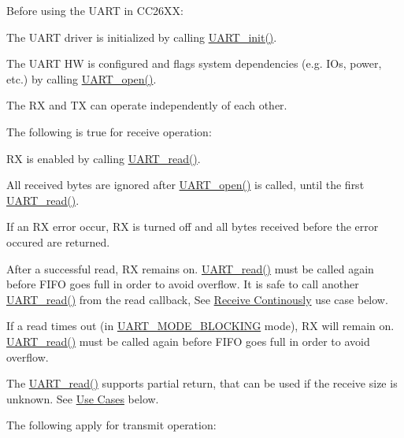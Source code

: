 Before using the U\+A\+R\+T in C\+C26\+X\+X\+:
\begin{DoxyItemize}
\item The U\+A\+R\+T driver is initialized by calling \hyperlink{_u_a_r_t_8h_ab60a36f7295d704926120d22f806dcd1}{U\+A\+R\+T\+\_\+init()}.
\item The U\+A\+R\+T H\+W is configured and flags system dependencies (e.\+g. I\+Os, power, etc.) by calling \hyperlink{_u_a_r_t_8h_a0442ea1ec23901168da31726bb3254c1}{U\+A\+R\+T\+\_\+open()}.
\item The R\+X and T\+X can operate independently of each other.
\end{DoxyItemize}The following is true for receive operation\+:
\begin{DoxyItemize}
\item R\+X is enabled by calling \hyperlink{_u_a_r_t_8h_a023152d57539cad94bdd813956013e73}{U\+A\+R\+T\+\_\+read()}.
\item All received bytes are ignored after \hyperlink{_u_a_r_t_8h_a0442ea1ec23901168da31726bb3254c1}{U\+A\+R\+T\+\_\+open()} is called, until the first \hyperlink{_u_a_r_t_8h_a023152d57539cad94bdd813956013e73}{U\+A\+R\+T\+\_\+read()}.
\item If an R\+X error occur, R\+X is turned off and all bytes received before the error occured are returned.
\item After a successful read, R\+X remains on. \hyperlink{_u_a_r_t_8h_a023152d57539cad94bdd813956013e73}{U\+A\+R\+T\+\_\+read()} must be called again before F\+I\+F\+O goes full in order to avoid overflow. It is safe to call another \hyperlink{_u_a_r_t_8h_a023152d57539cad94bdd813956013e73}{U\+A\+R\+T\+\_\+read()} from the read callback, See \hyperlink{_u_a_r_t_c_c26_x_x_8h_USE_CASE_CB}{Receive Continously} use case below.
\item If a read times out (in \hyperlink{_u_a_r_t_8h_a2507a620dba95cd20885c52494d19e90ae6b6bd5d2d5df859ad6724e89e605ebf}{U\+A\+R\+T\+\_\+\+M\+O\+D\+E\+\_\+\+B\+L\+O\+C\+K\+I\+N\+G} mode), R\+X will remain on. \hyperlink{_u_a_r_t_8h_a023152d57539cad94bdd813956013e73}{U\+A\+R\+T\+\_\+read()} must be called again before F\+I\+F\+O goes full in order to avoid overflow.
\item The \hyperlink{_u_a_r_t_8h_a023152d57539cad94bdd813956013e73}{U\+A\+R\+T\+\_\+read()} supports partial return, that can be used if the receive size is unknown. See \hyperlink{_u_a_r_t_c_c26_x_x_8h_USE_CASES}{Use Cases} below.
\end{DoxyItemize}The following apply for transmit operation\+:
